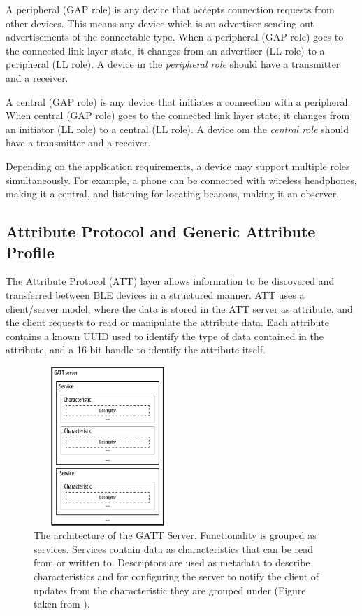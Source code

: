 A peripheral (GAP role) is any device that accepts connection requests from other devices. This means any device which is an advertiser sending out advertisements of the connectable type. When a peripheral (GAP role) goes to the connected link layer state, it changes from an advertiser (LL role) to a peripheral (LL role). A device in the \textit{peripheral role} should have a transmitter and a receiver.

A central (GAP role) is any device that initiates a connection with a peripheral. When central (GAP role) goes to the connected link layer state, it changes from an initiator (LL role) to a central (LL role). A device om the \textit{central role} should have a transmitter and a receiver.

Depending on the application requirements, a device may support multiple roles simultaneously. For example, a phone can be connected with wireless headphones, making it a central, and listening for locating beacons, making it an observer.

\subsection{Attribute Protocol and Generic Attribute Profile}
The Attribute Protocol (ATT) layer allows information to be discovered and transferred between BLE devices in a structured manner. ATT uses a client/server model, where the data is stored in the ATT server as attribute, and the client requests to read or manipulate the attribute data. Each attribute contains a known UUID used to identify the type of data contained in the attribute, and a 16-bit handle to identify the attribute itself. 

\begin{figure}[]
    \centering
    \includegraphics[width=0.5\textwidth,height=6cm,keepaspectratio=true]{images/gatt_service}
    \caption{
        The architecture of the GATT Server. Functionality is grouped as services. Services contain data as characteristics that can be read from or written to. Descriptors are used as metadata to describe characteristics and for configuring the server to notify the client of updates from the characteristic they are grouped under (Figure taken from \cite{townsend_cufi}).
    }
    \label{fig:gatt_server}
\end{figure}

